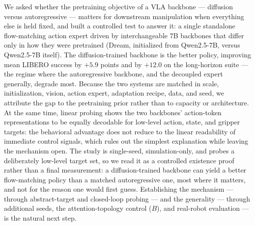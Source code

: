 \documentclass[conference]{IEEEtran}
\begin{document}
We asked whether the pretraining objective of a VLA backbone --- diffusion versus
autoregressive --- matters for downstream manipulation when everything else is
held fixed, and built a controlled test to answer it: a single standalone
flow-matching action expert driven by interchangeable 7B backbones that differ
only in how they were pretrained (Dream, initialized from Qwen2.5-7B, versus
Qwen2.5-7B itself). The diffusion-trained backbone is the better policy, improving
mean LIBERO success by $+5.9$ points and by $+12.0$ on the long-horizon suite ---
the regime where the autoregressive backbone, and the decoupled expert generally,
degrade most. Because the two systems are matched in scale, initialization,
vision, action expert, adaptation recipe, data, and seed, we attribute the gap to
the pretraining prior rather than to capacity or architecture. At the same time,
linear probing shows the two backbones' action-token representations to be equally
decodable for low-level action, state, and gripper targets: the behavioral
advantage does not reduce to the linear readability of immediate control signals,
which rules out the simplest explanation while leaving the mechanism open.
The study is single-seed, simulation-only, and probes a deliberately low-level
target set, so we read it as a controlled existence proof rather than a final
measurement: a diffusion-trained backbone can yield a better flow-matching policy
than a matched autoregressive one, most where it matters, and not for the reason
one would first guess. Establishing the mechanism --- through abstract-target and
closed-loop probing --- and the generality --- through additional seeds, the
attention-topology control ($B$), and real-robot evaluation --- is the natural
next step.
\end{document}
